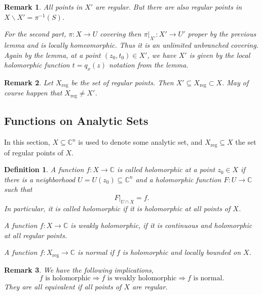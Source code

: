 \documentclass{article}
\newtheorem{definition}{Definition}[section]
\newtheorem{remark}{Remark}[section]
\DeclareMathOperator{\reg}{reg}
\newcommand{\C}[0]{\mathbb{C}}
\begin{document}
\begin{remark}
  All points in $X'$ are regular. But there are also regular points in $X\backslash X' = \pi^{-1}(S)$.
  \par For the second part, $\pi:X\to U$ covering then $\pi|_{X'}:X'\to U'$ proper by the previous lemma and is locally homeomorphic. Thus it is an unlimited unbranched covering. Again by the lemma, at a point $(z_0,t_0)\in X'$, we have $X'$ is given by the local holomorphic function $t= q_x(z)$ notation from the lemma.\\
\end{remark}

\begin{remark}
Let $X_{\reg}$ be the set of regular points. Then $X'\subseteq X_{\reg}\subset X$. May of course happen that $X_{\reg}\not= X'$.
\end{remark}

\subsection{Functions on Analytic Sets}

In this section, $X\subseteq\C^n$ is used to denote some analytic set, and $X_{\reg}\subseteq X$ the set of regular points of $X$.

\begin{definition}
  \label{definition_4_1}
  A function $f:X\to \C$ is called holomorphic at a point $z_0\in X$ if there is a neighborhood $U = U(z_0)\subseteq \C^n$ and a holomorphic function $F:U\to \C$ such that 
  \begin{equation*}
    F|_{U\cap X} = f.
  \end{equation*}
  In particular, it is called holomorphic if it is holomorphic at all points of $X$.
  \par A function $f:X\to \C$ is weakly holomorphic, if it is continuous and holomorphic at all regular points.
  \par A function $f:X_{\reg}\to \C$ is normal if $f$ is holomorphic and locally bounded on $X$.
\end{definition}

\begin{remark}
  We have the following implications,
  \begin{equation*}
    \text{$f$ is holomorphic}\Rightarrow\text{$f$ is weakly holomorphic}\Rightarrow\text{$f$ is normal}.
  \end{equation*}
  They are all equivalent if all points of $X$ are regular.
\end{remark}
\end{document}
